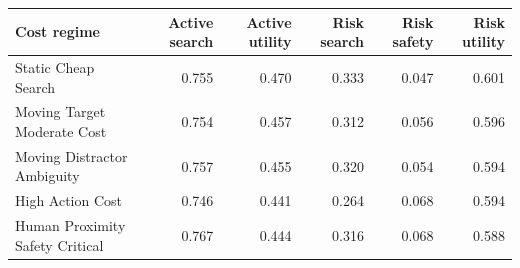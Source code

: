 \begin{tabular}{lrrrrr}
\toprule
Cost regime & Active search & Active utility & Risk search & Risk safety & Risk utility \\
\midrule
Static Cheap Search & 0.755 & 0.470 & 0.333 & 0.047 & 0.601 \\
Moving Target Moderate Cost & 0.754 & 0.457 & 0.312 & 0.056 & 0.596 \\
Moving Distractor Ambiguity & 0.757 & 0.455 & 0.320 & 0.054 & 0.594 \\
High Action Cost & 0.746 & 0.441 & 0.264 & 0.068 & 0.594 \\
Human Proximity Safety Critical & 0.767 & 0.444 & 0.316 & 0.068 & 0.588 \\
\bottomrule
\end{tabular}
